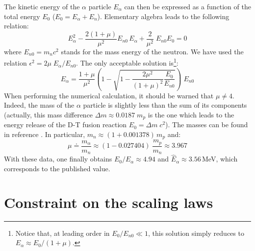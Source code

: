 The kinetic energy of the $\alpha$ particle $E_\alpha$ can then be expressed as a function of the total energy $E_0$ ($E_0 =E_\alpha + E_n$). Elementary algebra leads to the following relation:
\begin{equation}
    E_\alpha^2 - \frac{2(1+\mu)}{\mu^2}E_{n0}\, E_\alpha + \frac{2}{\mu^2}\; E_{n0}E_0 = 0
\end{equation}
where $E_{n0} = m_nc^2$ stands for the mass energy of the neutron. We have used the relation $\epsilon^2 = 2\mu\; E_\alpha/E_{n0}$. The only acceptable solution is\footnote{Notice that, at leading order in $E_0/E_{n0}\ll1$, this solution simply reduces to $E_\alpha \approx E_0/(1+\mu)$.}:
\begin{equation}
    E_\alpha = \frac{1+\mu}{\mu^2}
    \left( 1 - \sqrt{1-\frac{2\mu^2}{(1+\mu)^2}\frac{E_0}{E_{n0}}}\right)\; E_{n0}
\end{equation}
When performing the numerical calculation, it should be warned that $\mu\neq 4$. 
Indeed, the mass of the $\alpha$ particle is slightly less than the sum of its components (actually, this mass difference $\Delta m \approx 0.0187\; m_p$ is the one which leads to the energy release of the D-T fusion reaction $E_0 = \Delta m\;c^2$). The masses can be found in reference \cite{Wesson2004}. In particular, $m_n \approx (1+0.001378)\, m_p$ and:
$$
    \mu \doteq \frac{m_\alpha}{m_n} \approx (1-0.027404)\; \frac{m_p}{m_n} \approx 3.967
$$
With these data, one finally obtains $E_0/E_\alpha \approx 4.94$ and $\hat E_\alpha \approx 3.56\,$MeV, which corresponds to the published value.  

\section{Constraint on the scaling laws}
\label{appendix:scaling_law_dimensionless}

